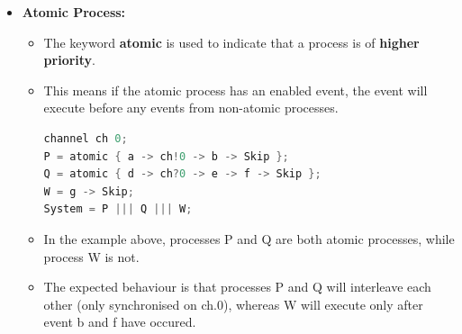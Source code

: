 \documentclass[10pt, landscape]{article}
\begin{document}
\begin{multicols*}{3}
  \begin{itemize}
    \item \textbf{Atomic Process:}
    \begin{itemize}
      \item The keyword \textbf{atomic} is used to indicate that a process is of \textbf{higher priority}.
      \item This means if the atomic process has an enabled event, the event will execute before any events from non-atomic processes.
\begin{lstlisting}[language=C]
channel ch 0;
P = atomic { a -> ch!0 -> b -> Skip };
Q = atomic { d -> ch?0 -> e -> f -> Skip };
W = g -> Skip;
System = P ||| Q ||| W;
\end{lstlisting}
      \item In the example above, processes P and Q are both atomic processes, while process W is not.
      \item The expected behaviour is that processes P and Q will interleave each other (only synchronised on ch.0), whereas W will execute only after event b and f have occured.
    \end{itemize}
  \end{itemize}
  \begin{center}
  \end{center}


\end{multicols*}
\end{document}
